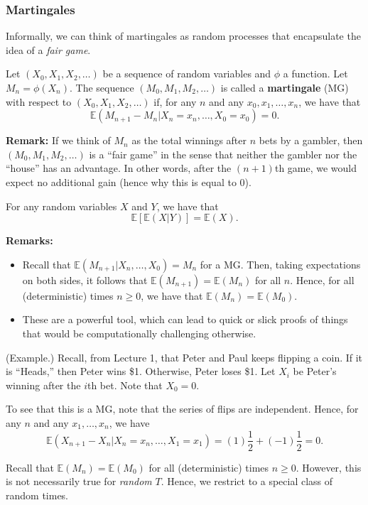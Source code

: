 \subsubsection{Martingales}
Informally, we can think of martingales as random processes that encapsulate the idea of a \emph{fair game}.
\begin{definition}{}{}
    Let $(X_0, X_1, X_2, \dots)$ be a sequence of random variables and $\phi$ a function. Let $M_n = \phi(X_n)$. The sequence $(M_0, M_1, M_2, \dots)$ is called a \textbf{martingale} (MG) with respect to $(X_0, X_1, X_2, \dots)$ if, for any $n$ and any $x_0, x_1, \dots, x_n$, we have that 
    \[\mathbb{E}(M_{n + 1} - M_{n} | X_{n} = x_n, \dots, X_0 = x_0) = 0.\]
\end{definition}
\textbf{Remark:} If we think of $M_n$ as the total winnings after $n$ bets by a gambler, then $(M_0, M_1, M_2, \dots)$ is a ``fair game'' in the sense that neither the gambler nor the ``house'' has an advantage. In other words, after the $(n + 1)$th game, we would expect no additional gain (hence why this is equal to 0).

\begin{theorem}{}{}
    For any random variables $X$ and $Y$, we have that 
    \[\mathbb{E}[\mathbb{E}(X | Y)] = \mathbb{E}(X).\]
\end{theorem}
\textbf{Remarks:} 
\begin{itemize}
    \item Recall that $\mathbb{E}(M_{n + 1} | X_n, \dots, X_0) = M_n$ for a MG. Then, taking expectations on both sides, it follows that $\mathbb{E}(M_{n + 1}) = \mathbb{E}(M_n)$ for all $n$. Hence, for all (deterministic) times $n \geq 0$, we have that $\mathbb{E}(M_n) = \mathbb{E}(M_0)$. 
    \item These are a powerful tool, which can lead to quick or slick proofs of things that would be computationally challenging otherwise. 
\end{itemize}

\begin{mdframed}[]
    (Example.) Recall, from Lecture 1, that Peter and Paul keeps flipping a coin. If it is ``Heads,'' then Peter wins \$1. Otherwise, Peter loses \$1. Let $X_i$ be Peter's winning after the $i$th bet. Note that $X_0 = 0$.

    \bigskip 

    To see that this is a MG, note that the series of flips are independent. Hence, for any $n$ and any $x_1, \dots, x_n$, we have 
    \[\mathbb{E}(X_{n + 1} - X_{n} | X_n = x_n, \dots, X_1 = x_1) = (1)\frac{1}{2} + (-1) \frac{1}{2} = 0.\]
\end{mdframed}
Recall that $\mathbb{E}(M_n) = \mathbb{E}(M_0)$ for all (deterministic) times $n \geq 0$. However, this is not necessarily true for \emph{random} $T$. Hence, we restrict to a special class of random times. 

